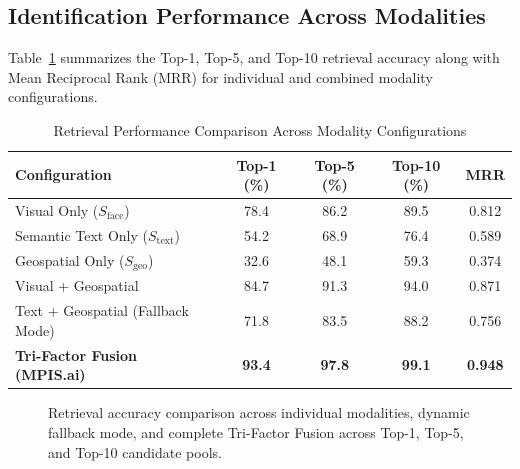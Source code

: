 \documentclass[conference]{IEEEtran}
\begin{document}
\subsection{Identification Performance Across Modalities}
Table~\ref{tab:modality_eval} summarizes the Top-1, Top-5, and Top-10 retrieval accuracy along with Mean Reciprocal Rank (MRR) for individual and combined modality configurations.

\begin{table}[htbp]
\caption{Retrieval Performance Comparison Across Modality Configurations}
\label{tab:modality_eval}
\centering
\small
\begin{tabularx}{\columnwidth}{Xcccc}
\toprule
\textbf{Configuration} & \textbf{Top-1 (\%)} & \textbf{Top-5 (\%)} & \textbf{Top-10 (\%)} & \textbf{MRR} \\
\midrule
Visual Only ($S_{\text{face}}$)        & 78.4 & 86.2 & 89.5 & 0.812 \\
Semantic Text Only ($S_{\text{text}}$) & 54.2 & 68.9 & 76.4 & 0.589 \\
Geospatial Only ($S_{\text{geo}}$)     & 32.6 & 48.1 & 59.3 & 0.374 \\
Visual + Geospatial                     & 84.7 & 91.3 & 94.0 & 0.871 \\
Text + Geospatial (Fallback Mode)       & 71.8 & 83.5 & 88.2 & 0.756 \\
\textbf{Tri-Factor Fusion (MPIS.ai)}    & \textbf{93.4} & \textbf{97.8} & \textbf{99.1} & \textbf{0.948} \\
\bottomrule
\end{tabularx}
\end{table}

\begin{figure}[htbp]
\centering
{}
\caption{Retrieval accuracy comparison across individual modalities, dynamic fallback mode, and complete Tri-Factor Fusion across Top-1, Top-5, and Top-10 candidate pools.}
\label{fig:accuracy_chart}
\end{figure}
\end{document}
